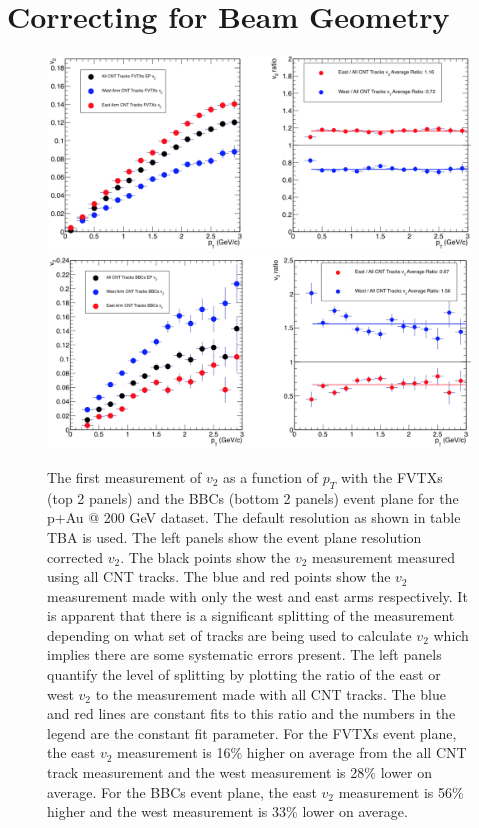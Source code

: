 \section{Correcting for Beam Geometry}
\begin{figure}[!h]
\begin{center}
\includegraphics[width=0.85\linewidth]{figs/fvtxs_default_ew.png}
\includegraphics[width=0.85\linewidth]{figs/bbcs_default_ew.png}
\caption{The first measurement of $v_{2}$ as a function of $p_T$ with the FVTXs (top 2 panels) and the BBCs (bottom 2 panels) event plane for the p+Au @ 200 GeV dataset. The default resolution as shown in table TBA is used. The left panels show the event plane resolution corrected $v_2$. The black points show the $v_2$ measurement measured using all CNT tracks. The blue and red points show the $v_2$ measurement made with only the west and east arms respectively. It is apparent that there is a significant splitting of the measurement depending on what set of tracks are being used to calculate $v_2$ which implies there are some systematic errors present. The left panels quantify the level of splitting by plotting the ratio of the east or west $v_2$ to the measurement made with all CNT tracks. The blue and red lines are constant fits to this ratio and the numbers in the legend are the constant fit parameter. For the FVTXs event plane, the east $v_2$ measurement is 16$\%$ higher on average from the all CNT track measurement and the west measurement is 28$\%$ lower on average. For the BBCs event plane, the east $v_2$ measurement is 56$\%$ higher and the west measurement is 33$\%$ lower on average.}
\label{fig:fvtx_ew_default}
\end{center}
\end{figure}

